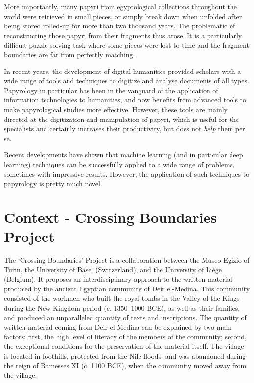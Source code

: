 \documentclass[11pt]{report}
\begin{document}
More importantly, many papyri from egyptological collections throughout the world were retrieved in small pieces, or simply break down when unfolded after being stored rolled-up for more than two thousand years. The problematic of reconstructing those papyri from their fragments thus arose. It is a particularly difficult puzzle-solving task where some pieces were lost to time and the fragment boundaries are far from perfectly matching.\newline

In recent years, the development of digital humanities provided scholars with a wide range of tools and techniques to digitize and analyse documents of all types. Papyrology in particular has been in the vanguard of the application of information technologies to humanities, and now benefits from advanced tools to make papyrological studies more effective. However, these tools are mainly directed at the digitization and manipulation of papyri, which is useful for the specialists and certainly increases their productivity, but does not \emph{help} them per se.\newline

Recent developments have shown that machine learning (and in particular deep learning) techniques can be successfully applied to a wide range of problems, sometimes with impressive results. However, the application of such techniques to papyrology is pretty much novel.


\section{Context - Crossing Boundaries Project}

The ‘Crossing Boundaries’ Project is a collaboration between the Museo Egizio of Turin, the University of Basel (Switzerland), and the University of Liège (Belgium). It proposes an interdisciplinary approach to the written material produced by the ancient Egyptian community of Deir el-Medina. This community consisted of the workmen who built the royal tombs in the Valley of the Kings during the New Kingdom period (c. 1350–1000 BCE), as well as their families, and produced an unparalleled quantity of texts and inscriptions.\newline
The quantity of written material coming from Deir el-Medina can be explained by two main factors: first, the high level of literacy of the members of the community; second, the exceptional conditions for the preservation of the material itself. The village is located in foothills, protected from the Nile floods, and was abandoned during the reign of Ramesses XI (c. 1100 BCE), when the community moved away from the village.
\end{document}
